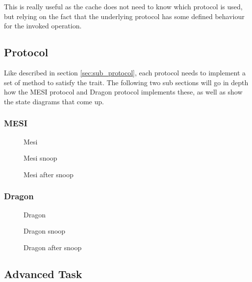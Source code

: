 This is really useful as the cache does not need to know which protocol is used, but relying on the
fact that the underlying protocol has some defined behaviour for the invoked operation.


\subsection{Protocol}
Like described in section \ref{sec:sub_protocol}, each protocol needs to implement a set of method
to satisfy the trait.  The following two sub sections will go in depth how the MESI protocol and
Dragon protocol implements these, as well as show the state diagrams that come up.

\subsubsection{MESI}

\begin{figure}[ht]
    \centering
    \caption{Mesi}
    \label{fig:mesi}
\end{figure}

\begin{figure}[ht]
    \centering
    \caption{Mesi snoop}
    \label{fig:mesi_snoop}
\end{figure}

\begin{figure}[ht]
    \centering
    \caption{Mesi after snoop}
    \label{fig:mesi_after_snoop}
\end{figure}

\subsubsection{Dragon}

\begin{figure}[ht]
    \centering
    \caption{Dragon}
    \label{fig:dragon}
\end{figure}


\begin{figure}[ht]
    \centering
    \caption{Dragon snoop}
    \label{fig:dragon_snoop}
\end{figure}

\begin{figure}[ht]
    \centering
    \caption{Dragon after snoop}
    \label{fig:dragon_after_snoop}
\end{figure}

\subsection{Advanced Task}
